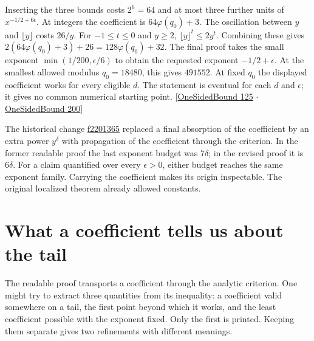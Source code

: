 \documentclass[12pt,letterpaper]{article}
\begin{document}
Inserting the three bounds costs $2^6=64$ and at most three further units of $x^{-1/2+6\epsilon}$. At integers the coefficient is $64\varphi(q_0)+3$. The oscillation between $y$ and $\lfloor y\rfloor$ costs $26/y$. For $-1\le t\le0$ and $y\ge2$, $\lfloor y\rfloor^t\le2y^t$. Combining these gives $2(64\varphi(q_0)+3)+26=128\varphi(q_0)+32$. The final proof takes the small exponent $\min(1/200,\epsilon/6)$ to obtain the requested exponent $-1/2+\epsilon$. At the smallest allowed modulus $q_0=18480$, this gives $491552$. At fixed $q_0$ the displayed coefficient works for every eligible $d$. The statement is eventual for each $d$ and $\epsilon$; it gives no common numerical starting point. {\small\sffamily\color{mute}[\href{https://github.com/leanprover-community/riemann-hypothesis/blob/e063a923620ee7787b4a1270421478645bf66bdb/src/New/Reduction/OneSidedBound.lean#L125}{OneSidedBound 125} $\cdot$ \href{https://github.com/leanprover-community/riemann-hypothesis/blob/e063a923620ee7787b4a1270421478645bf66bdb/src/New/Reduction/OneSidedBound.lean#L200}{OneSidedBound 200}]}

The historical change \href{https://github.com/leanprover-community/riemann-hypothesis/commit/f2201365d2d57b1deb4fd330aa0da37213457074}{f2201365} replaced a final absorption of the coefficient by an extra power $y^\delta$ with propagation of the coefficient through the criterion. In the former readable proof the last exponent budget was $7\delta$; in the revised proof it is $6\delta$. For a claim quantified over every $\epsilon>0$, either budget reaches the same exponent family. Carrying the coefficient makes its origin inspectable. The original localized theorem already allowed constants.



\section{What a coefficient tells us about the tail}\label{sec:coefficient}
The readable proof transports a coefficient through the analytic criterion. One might try to extract three quantities from its inequality: a coefficient valid somewhere on a tail, the first point beyond which it works, and the least coefficient possible with the exponent fixed. Only the first is printed. Keeping them separate gives two refinements with different meanings.
\end{document}
